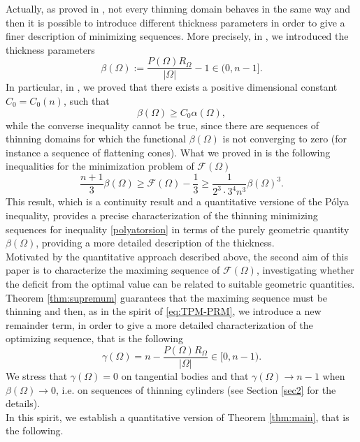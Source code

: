 \documentclass[oneside,a4paper,11pt,notitlepage]{article}
\newcommand{\abs}[1]{{\left|#1\right|}}
\theoremstyle{definition}
\theoremstyle{plain}
\theoremstyle{definition}
\begin{document}
Actually, as proved in \cite{AGS}, not every thinning domain behaves in the same way and then it is possible to introduce different thickness parameters in order to give a finer description of minimizing sequences. More precisely, in \cite[subsection $2.4$]{AGS}, we introduced the thickness parameters
\begin{equation}
\label{beta}
\beta(\Omega):=\frac{P(\Omega)R_\Omega}{|\Omega|}-1 \in(0,n-1].
\end{equation}  
In particular, in \cite[Proposition $1.1$]{AGS}, we proved that there exists a positive dimensional constant $C_0=C_0(n)$, such that
\begin{equation*}
    \beta(\Omega)\ge C_0\alpha(\Omega),
\end{equation*}
while the converse inequality cannot be true, since there are sequences of thinning domains for which the functional $\beta(\Omega)$
is not converging to zero (for instance a sequence of flattening cones).
What we proved in \cite{AGS} is the following inequalities for the minimization problem of $\mathcal{F}(\Omega)$
\begin{equation}\label{eq:TPM-PRM}
\frac{n+1}{3}\beta(\Omega)\ge 
\mathcal{F}(\Omega)-\frac{1}{3} \ge \frac{1}{2^3\cdot 3^4 n^3} \beta(\Omega)^3.
\end{equation}    
This result, which is a continuity result and a quantitative versione of the P\'olya inequality, provides a precise characterization of the thinning minimizing sequences for inequality \eqref{polyatorsion} in terms of the purely geometric quantity $\beta(\Omega)$, providing a more detailed description of the thickness.\\

Motivated by the quantitative approach described above, the second aim of this paper is to characterize the maximing sequence of $\mathcal{F}(\Omega)$, investigating whether the deficit from the optimal value can be related to suitable geometric quantities. Theorem \ref{thm:supremum} guarantees that the maximing sequence must be thinning and then, as in the spirit of \eqref{eq:TPM-PRM}, we introduce a new  remainder term, in order to give a more detailed characterization of the optimizing sequence, that is the following
\begin{equation}\label{gamma}
    \gamma(\Omega) = n-\frac{P(\Omega)R_\Omega}{\abs{\Omega}}\in [0,n-1).
\end{equation}
We stress that $\gamma(\Omega)= 0$ on tangential bodies and that $\gamma(\Omega)\to n-1$ when $\beta(\Omega) \to 0$, i.e. on sequences of thinning cylinders (see Section \ref{sec2} for the details).\\ 
In this spirit, we establish a quantitative version of Theorem \ref{thm:main}, that is the following.
\end{document}
